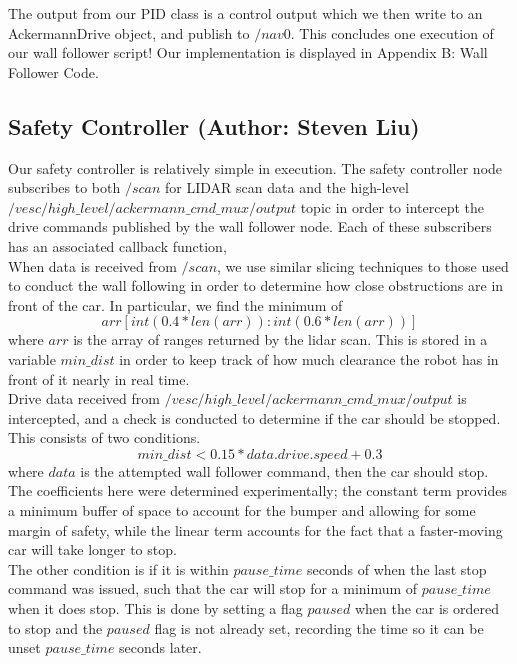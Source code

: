\documentclass{article}
\begin{document}
The output from our PID class is a control output which we then write to an AckermannDrive object, and publish to $/nav0$. This concludes one execution of our wall follower script! Our implementation is displayed in Appendix B: Wall Follower Code. 


\subsection{Safety Controller (Author: Steven Liu)}

Our safety controller is relatively simple in execution. The safety controller node subscribes to both $/scan$ for LIDAR scan data and the high-level $/vesc/high\_level/ackermann\_cmd\_mux/output$ topic in order to intercept the drive commands published by the wall follower node. Each of these subscribers has an associated callback function, \\

When data is received from $/scan$, we use similar slicing techniques to those used to conduct the wall following in order to determine how close obstructions are in front of the car. In particular, we find the minimum of 
\begin{equation}
    arr[int(0.4*len(arr)):int(0.6*len(arr))]
\end{equation}
where $arr$ is the array of ranges returned by the lidar scan. This is stored in a variable $min\_dist$ in order to keep track of how much clearance the robot has in front of it nearly in real time. \\

Drive data received from $/vesc/high\_level/ackermann\_cmd\_mux/output$ is intercepted, and a check is conducted to determine if the car should be stopped. This consists of two conditions.
\begin{equation}
    min\_dist < 0.15*data.drive.speed+0.3
\end{equation}
where $data$ is the attempted wall follower command, then the car should stop. The coefficients here were determined experimentally; the constant term provides a minimum buffer of space to account for the bumper and allowing for some margin of safety, while the linear term accounts for the fact that a faster-moving car will take longer to stop. \\

The other condition is if it is within $pause\_time$ seconds of when the last stop command was issued, such that the car will stop for a minimum of $pause\_time$ when it does stop. This is done by setting a flag $paused$ when the car is ordered to stop and the $paused$ flag is not already set, recording the time so it can be unset $pause\_time$ seconds later. \\
\end{document}
